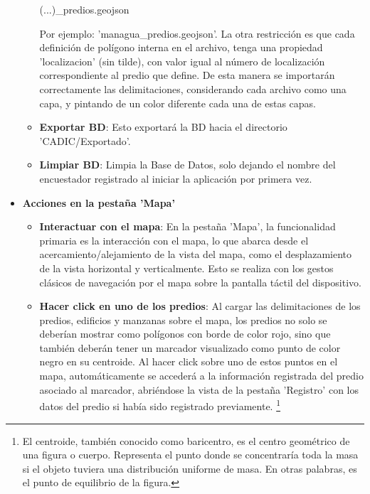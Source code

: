 \begin{itemize}
\begin{itemize}
                    \begin{mdframed}
                        (...)\_predios.geojson
                    \end{mdframed}
                    Por ejemplo: 'managua\_predios.geojson'. La otra restricción es que cada definición de polígono interna en el archivo,
                    tenga una propiedad 'localizacion' (sin tilde), con valor igual al número de localización correspondiente al predio que define.
                    De esta manera se importarán correctamente las delimitaciones, considerando cada archivo como una capa, y pintando de un color
                    diferente cada una de estas capas.

              \item \textbf{Exportar BD}: Esto exportará la BD hacia el directorio 'CADIC/Exportado'.
              \item \textbf{Limpiar BD}: Limpia la Base de Datos, solo dejando el nombre del encuestador registrado al iniciar la aplicación por primera vez.
          \end{itemize}
    \item \textbf{Acciones en la pestaña 'Mapa'}
          \begin{itemize}
              \item \textbf{Interactuar con el mapa}: En la pestaña 'Mapa', la funcionalidad primaria es la interacción con el mapa, lo que abarca desde
                    el acercamiento/alejamiento de la vista del mapa, como el desplazamiento de la vista horizontal y verticalmente. Esto se realiza con
                    los gestos clásicos de navegación por el mapa sobre la pantalla táctil del dispositivo.
              \item \textbf{Hacer click en uno de los predios}: Al cargar las delimitaciones de los predios, edificios y manzanas sobre el mapa,
                    los predios no solo se deberían mostrar como polígonos con borde de color rojo, sino que también deberán tener un marcador visualizado
                    como punto de color negro en su centroide. Al hacer click sobre uno de estos puntos en el mapa, automáticamente se accederá a la información
                    registrada del predio asociado al marcador, abriéndose la vista de la pestaña 'Registro' con los datos del predio si había sido registrado previamente.
                    \footnote{El centroide, también conocido como baricentro, es el centro geométrico de una figura o cuerpo. Representa el punto donde se concentraría toda
                        la masa si el objeto tuviera una distribución uniforme de masa. En otras palabras, es el punto de equilibrio de la figura. }


\end{itemize}
\end{itemize}

